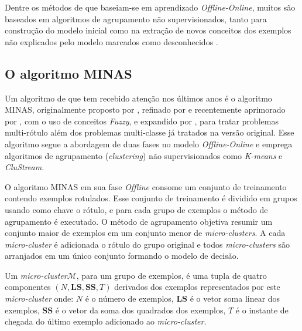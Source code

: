 Dentre os métodos de \nd que baseiam-se em aprendizado \emph{Offline-Online},
muitos são baseados em algoritmos de agrupamento não supervisionados, tanto
para construção do modelo inicial como na extração de novos conceitos dos
exemplos não explicados pelo modelo marcados como desconhecidos
\cite{Spinosa2009ollinda,Masud2010ECSMiner,Faria2013}.

\subsection{O algoritmo MINAS}\label{sec:minas-og}

Um algoritmo de \nd que tem recebido atenção nos últimos anos é o algoritmo
MINAS, originalmente proposto por , refinado por
 e recentemente aprimorado por
, com o uso de conceitos \emph{Fuzzy}, e expandido por
, para tratar problemas multi-rótulo além dos problemas
multi-classe já tratados na versão original.
Esse algoritmo segue a abordagem de duas fases no modelo \emph{Offline-Online} e
emprega algoritmos de agrupamento (\emph{clustering}) não supervisionados como
\emph{K-means} e \emph{CluStream}.

\newcommand{\mcluster}{\emph{micro-cluster}\xspace}
\newcommand{\mclusters}{\emph{micro-clusters}\xspace}

O algoritmo MINAS em sua fase \emph{Offline} consome um conjunto de treinamento
contendo exemplos rotulados.
Esse conjunto de treinamento é dividido em grupos usando como chave o rótulo,
e para cada grupo de exemplos o método de agrupamento é executado.
O método de agrupamento objetiva resumir um conjunto maior de exemplos em um
conjunto menor de \mclusters.
A cada \mcluster é adicionada o rótulo do grupo original e todos \mclusters
são arranjados em um único conjunto formando o modelo de decisão.

\begin{definition}
  Um \mcluster $\mathcal{M}$, para um grupo de exemplos, é uma tupla de quatro componentes
  $(N, \mathbf{LS}, \mathbf{SS}, T)$ derivados dos exemplos representados por
  este \mcluster onde:
  $N$ é o número de exemplos,
  $\mathbf{LS}$ é o vetor soma linear dos exemplos,
  $\mathbf{SS}$ é o vetor da soma dos quadrados dos exemplos,
  $T$ é o instante de chegada do último exemplo adicionado ao \mcluster.
\end{definition}


